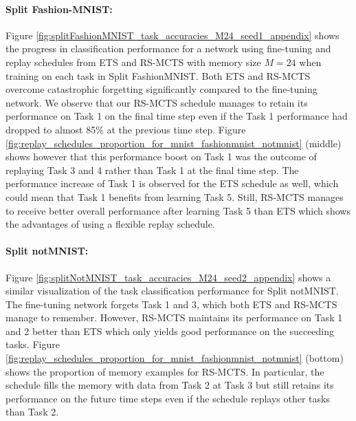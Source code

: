 \paragraph{Split Fashion-MNIST:} Figure \ref{fig:splitFashionMNIST_task_accuracies_M24_seed1_appendix} shows the progress in classification performance for a network using fine-tuning and replay schedules from ETS and RS-MCTS with memory size $M=24$ when training on each task in Split FashionMNIST. Both ETS and RS-MCTS overcome catastrophic forgetting significantly compared to the fine-tuning network. We observe that our RS-MCTS schedule manages to retain its performance on Task 1 on the final time step even if the Task 1 performance had dropped to almost 85\% at the previous time step. Figure \ref{fig:replay_schedules_proportion_for_mnist_fashionmnist_notmnist} (middle) shows however that this performance boost on Task 1 was the outcome of replaying Task 3 and 4 rather than Task 1 at the final time step. The performance increase of Task 1 is observed for the ETS schedule as well, which could mean that Task 1 benefits from learning Task 5. Still, RS-MCTS manages to receive better overall performance after learning Task 5 than ETS which shows the advantages of using a flexible replay schedule. 
\vspace{-10pt}



\paragraph{Split notMNIST:} Figure \ref{fig:splitNotMNIST_task_accuracies_M24_seed2_appendix} shows a similar visualization of the task classification performance for Split notMNIST. The fine-tuning network forgets Task 1 and 3, which both ETS and RS-MCTS manage to remember. However, RS-MCTS maintains its performance on Task 1 and 2 better than ETS which only yields good performance on the succeeding tasks. Figure \ref{fig:replay_schedules_proportion_for_mnist_fashionmnist_notmnist} (bottom) shows the proportion of memory examples for RS-MCTS. In particular, the schedule fills the memory with data from Task 2 at Task 3 but still retains its performance on the future time steps even if the schedule replays other tasks than Task 2.
\vspace{-10pt}




